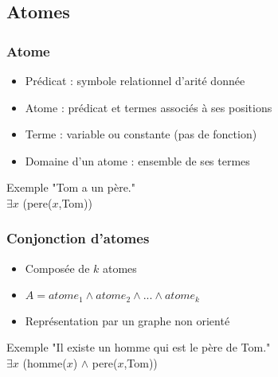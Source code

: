 
\subsection{Atomes}
\begin{frame}
	\frametitle{Atome}
	\begin{center}
	\begin{itemize}
		\item Prédicat : symbole relationnel d'arité donnée
		\item Atome : prédicat et termes associés à ses positions
		\item Terme : variable ou constante (pas de fonction)
		\item Domaine d'un atome : ensemble de ses termes
	\end{itemize}
	\vspace{10mm}
	\begin{exampleblock}{Exemple}
	"Tom a un père."\\
	$\exists x$ (pere($x$,Tom))
	\end{exampleblock}
	\end{center}
\end{frame}

\begin{frame}
	\frametitle{Conjonction d'atomes}
	\begin{center}
	\begin{itemize}
		\item Composée de $k$ atomes
		\item $A = atome_1 \wedge atome_2 \wedge ... \wedge atome_k$
		\item Représentation par un graphe non orienté
	\end{itemize}
	\vspace{10mm}
	\begin{exampleblock}{Exemple}
		"Il existe un homme qui est le père de Tom."\\
		$\exists x$ (homme($x$) $\wedge$ pere($x$,Tom))
	\end{exampleblock}
	\end{center}
\end{frame}

